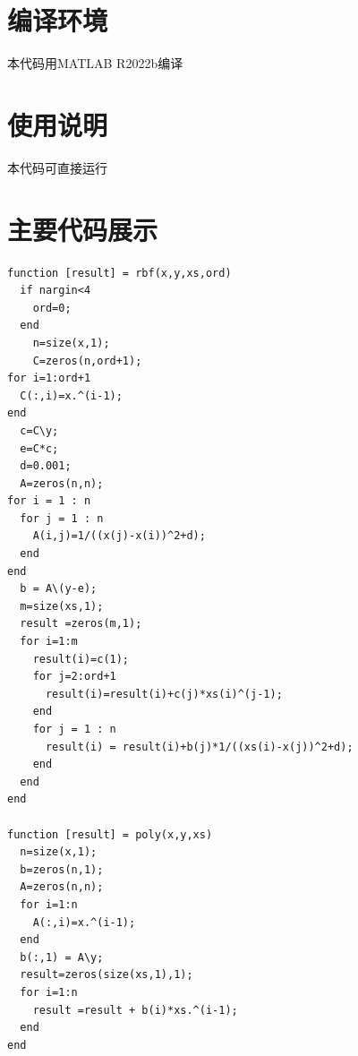 \documentclass{article}
\begin{document}
	\section{编译环境}
	本代码用MATLAB R2022b编译
	\section{使用说明}
	本代码可直接运行
	\section{主要代码展示}
	\lstset{language=Matlab}
	\lstset{breaklines}%
	\begin{lstlisting}
function [result] = rbf(x,y,xs,ord)
  if nargin<4
	ord=0;
  end
	n=size(x,1);
	C=zeros(n,ord+1);
for i=1:ord+1
  C(:,i)=x.^(i-1);
end
  c=C\y;
  e=C*c;
  d=0.001;
  A=zeros(n,n);
for i = 1 : n
  for j = 1 : n
    A(i,j)=1/((x(j)-x(i))^2+d);
  end
end
  b = A\(y-e);
  m=size(xs,1);
  result =zeros(m,1);
  for i=1:m
    result(i)=c(1);
    for j=2:ord+1
      result(i)=result(i)+c(j)*xs(i)^(j-1);
    end
    for j = 1 : n
      result(i) = result(i)+b(j)*1/((xs(i)-x(j))^2+d);
    end
  end
end

function [result] = poly(x,y,xs)
  n=size(x,1);
  b=zeros(n,1);
  A=zeros(n,n);
  for i=1:n
    A(:,i)=x.^(i-1);
  end
  b(:,1) = A\y;
  result=zeros(size(xs,1),1);
  for i=1:n
    result =result + b(i)*xs.^(i-1);
  end
end
	\end{lstlisting}
\end{document}

